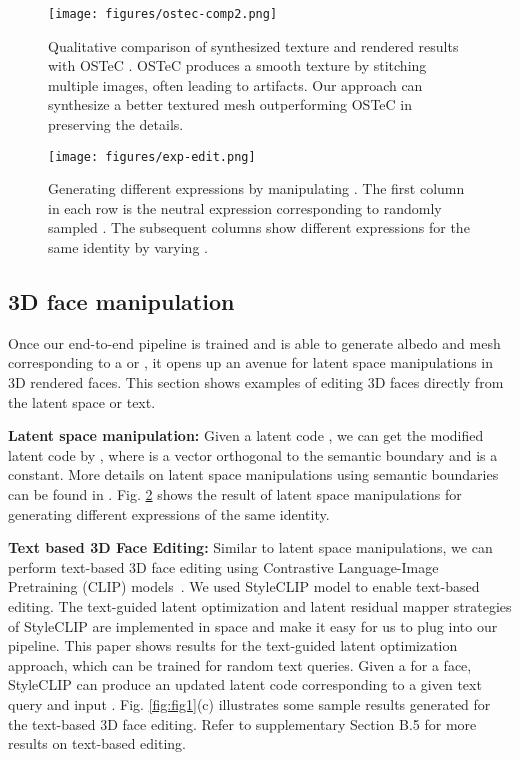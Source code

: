 \documentclass[10pt,twocolumn,letterpaper]{article}
\begin{document}
\begin{figure}[h]
\centering
\texttt{[image: figures/ostec-comp2.png]}
\caption{Qualitative comparison of synthesized texture and rendered results with OSTeC \cite{Gecer_2021_CVPR}. 
OSTeC produces a smooth texture by stitching multiple images, often leading to artifacts.
Our approach can synthesize a better textured mesh outperforming OSTeC in preserving the details. }
\label{fig:OSTeC_vs_ours}
\vspace{-2mm}
\end{figure}




\begin{figure}[h]
\centering
\texttt{[image: figures/exp-edit.png]}
\caption{Generating different expressions by manipulating . The first column in each row is the neutral expression corresponding to randomly sampled . The subsequent columns show different expressions for the same identity by varying . }
\label{fig:expressions}
\vspace{-4mm}
\end{figure}


\subsection{3D face manipulation}

 Once our end-to-end pipeline is trained and is able to generate albedo and mesh corresponding to a  or , it opens up an avenue for latent space manipulations in 3D rendered faces. This section shows examples of editing 3D faces directly from the latent space or text.

{\bf Latent space manipulation:} Given a latent code , we can get the modified latent code  by , where  is a vector orthogonal to the semantic boundary and  is a constant. More details on latent space manipulations using semantic boundaries can be found in \cite{shen2020interfacegan, rai2021improved}. Fig. \ref{fig:expressions} shows the result of latent space manipulations for generating different expressions of the same identity. 

{\bf Text based 3D Face Editing:} Similar to latent space manipulations, we can perform text-based 3D face editing using Contrastive Language-Image Pretraining
(CLIP) models~\cite{radford2021learning}. We used StyleCLIP \cite{patashnik2021styleclip} model to enable text-based editing. The text-guided latent optimization and latent residual mapper strategies of StyleCLIP are implemented in  space and make it easy for us to plug into our pipeline. This paper shows results for the text-guided latent optimization approach, which can be trained for random text queries. Given a  for a face, StyleCLIP can produce an updated latent code  corresponding to a given text query and input . Fig. \ref{fig:fig1}(c) illustrates some sample results generated for the text-based 3D face editing.  Refer to supplementary Section B.5 for more results on text-based editing.
\end{document}
